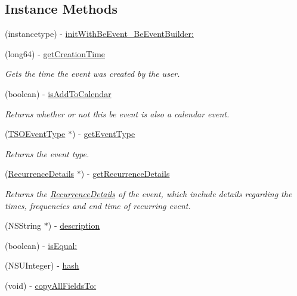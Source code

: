 \subsection*{Instance Methods}
\begin{DoxyCompactItemize}
\item 
(instancetype) -\/ \hyperlink{interface_be_event_ae66bdee5e64a2656f65e96552251c353}{init\+With\+Be\+Event\+\_\+\+Be\+Event\+Builder\+:}
\item 
(long64) -\/ \hyperlink{interface_be_event_a3d0e2c40f86091fe6af2d127670f281a}{get\+Creation\+Time}
\begin{DoxyCompactList}\small\item\em Gets the time the event was created by the user. \end{DoxyCompactList}\item 
(boolean) -\/ \hyperlink{interface_be_event_aefaa98fe57698a5f6f9d0daa0d91f25d}{is\+Add\+To\+Calendar}
\begin{DoxyCompactList}\small\item\em Returns whether or not this be event is also a calendar event. \end{DoxyCompactList}\item 
(\hyperlink{interface_t_s_o_event_type}{T\+S\+O\+Event\+Type} $\ast$) -\/ \hyperlink{interface_be_event_a940b72403160693699f912ef27e3ef05}{get\+Event\+Type}
\begin{DoxyCompactList}\small\item\em Returns the event type. \end{DoxyCompactList}\item 
(\hyperlink{interface_recurrence_details}{Recurrence\+Details} $\ast$) -\/ \hyperlink{interface_be_event_ad92073729efb9b551e47085d3b28458a}{get\+Recurrence\+Details}
\begin{DoxyCompactList}\small\item\em Returns the \hyperlink{interface_recurrence_details}{Recurrence\+Details} of the event, which include details regarding the times, frequencies and end time of recurring event. \end{DoxyCompactList}\item 
(N\+S\+String $\ast$) -\/ \hyperlink{interface_be_event_af4269010bf1a0a5ffa6d5d5c84463c14}{description}
\item 
(boolean) -\/ \hyperlink{interface_be_event_a5b1ce21bef1f6ebfd424e8a557c51dae}{is\+Equal\+:}
\item 
(N\+S\+U\+Integer) -\/ \hyperlink{interface_be_event_acb1c61c919df7eabff62a1b4afe44d04}{hash}
\item 
(void) -\/ \hyperlink{interface_be_event_a933beb38694bfb7cce6af071ccdd1075}{copy\+All\+Fields\+To\+:}
\end{DoxyCompactItemize}
